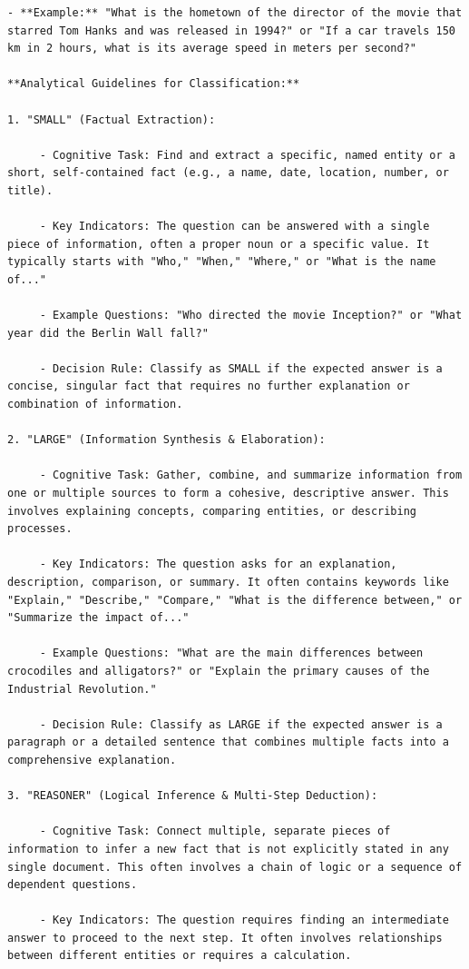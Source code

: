 \documentclass[11pt]{article}
\begin{document}
\begin{lstlisting}[basicstyle=\scriptsize\ttfamily]
    - **Example:** "What is the hometown of the director of the movie that starred Tom Hanks and was released in 1994?" or "If a car travels 150 km in 2 hours, what is its average speed in meters per second?"

**Analytical Guidelines for Classification:**

1. "SMALL" (Factual Extraction):

     - Cognitive Task: Find and extract a specific, named entity or a short, self-contained fact (e.g., a name, date, location, number, or title).

     - Key Indicators: The question can be answered with a single piece of information, often a proper noun or a specific value. It typically starts with "Who," "When," "Where," or "What is the name of..."

     - Example Questions: "Who directed the movie Inception?" or "What year did the Berlin Wall fall?"

     - Decision Rule: Classify as SMALL if the expected answer is a concise, singular fact that requires no further explanation or combination of information.

2. "LARGE" (Information Synthesis & Elaboration):

     - Cognitive Task: Gather, combine, and summarize information from one or multiple sources to form a cohesive, descriptive answer. This involves explaining concepts, comparing entities, or describing processes.

     - Key Indicators: The question asks for an explanation, description, comparison, or summary. It often contains keywords like "Explain," "Describe," "Compare," "What is the difference between," or "Summarize the impact of..."

     - Example Questions: "What are the main differences between crocodiles and alligators?" or "Explain the primary causes of the Industrial Revolution."

     - Decision Rule: Classify as LARGE if the expected answer is a paragraph or a detailed sentence that combines multiple facts into a comprehensive explanation.

3. "REASONER" (Logical Inference & Multi-Step Deduction):

     - Cognitive Task: Connect multiple, separate pieces of information to infer a new fact that is not explicitly stated in any single document. This often involves a chain of logic or a sequence of dependent questions.

     - Key Indicators: The question requires finding an intermediate answer to proceed to the next step. It often involves relationships between different entities or requires a calculation.


\end{lstlisting}
\end{document}
